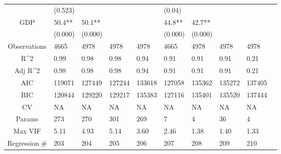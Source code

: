 \documentclass{article}
\begin{document}
\begin{table}[H]
\begin{tabular}{|clllllllll|}
   & (0.523) &  &  &  & (0.04) &  &  &  & \\ 
  GDP & 50.4** & 50.1** &  &  & 44.8** & 42.7** &  &  & \\ 
   & (0.000) & (0.000) &  &  & (0.000) & (0.000) &  &  & \\ 
  \hline 
 Observations & 4665 & 4978 & 4978 & 4978 & 4665 & 4978 & 4978 & 4978 & \\ 
  R^2 & 0.99 & 0.98 & 0.98 & 0.94 & 0.91 & 0.91 & 0.91 & 0.21 & \\ 
  Adj R^2 & 0.98 & 0.98 & 0.98 & 0.94 & 0.91 & 0.91 & 0.91 & 0.21 & \\ 
  AIC & 119071 & 127449 & 127244 & 133618 & 127058 & 135362 & 135272 & 137405 & \\ 
  BIC & 120844 & 129220 & 129217 & 135383 & 127116 & 135401 & 135520 & 137444 & \\ 
  CV & NA & NA & NA & NA & NA & NA & NA & NA & \\ 
  Params & 273 & 270 & 301 & 269 & 7 & 4 & 36 & 4 & \\ 
  Max VIF & 5.11 & 4.93 & 5.14 & 3.60 & 2.46 & 1.38 & 1.40 & 1.33 & \\ 
  Regression \# & 203 & 204 & 205 & 206 & 207 & 208 & 209 & 210 & \\ 
   \hline
\end{tabular}
 
\end{table}
\end{document}

